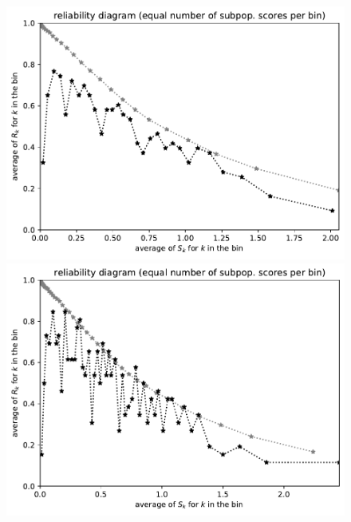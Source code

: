 \documentclass{article}
\begin{document}
\begin{figure}
\begin{centering}
\parbox{\imsize}{\includegraphics[width=\imsize]
       {./codes/unweighted/nll-1-60-night-snake-Hypsiglena-torquataequisamps30}}
\quad\quad
\parbox{\imsize}{\includegraphics[width=\imsize]
       {./codes/unweighted/nll-1-60-night-snake-Hypsiglena-torquataequisamps50}}

\vspace{\vertsep}


\end{centering}
\end{figure}
\end{document}
